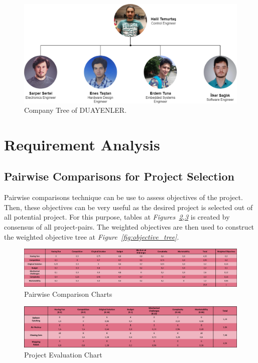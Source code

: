 \documentclass[a4paper,12pt]{article}
\begin{document}
\begin{figure}[t!]
	\centering
	\includegraphics[width=\textwidth,height=\textheight,keepaspectratio]{../../Documents/company/company-tree} 
	\caption{\label{fig:company_tree}Company Tree of DUAYENLER.}
\end{figure}


\section{Requirement Analysis}
	
	\subsection{Pairwise Comparisons for Project Selection}
		Pairwise comparisons technique can be use to assess objectives of the project. Then, these objectives can be very useful as the desired project is selected out of all potential project. For this purpose, tables at \textit{Figures~\ref{fig:pairwise_comp},\ref{fig:project_eval}} is created by consensus of all project-pairs. The weighted objectives are then used to construct the weighted objective tree at \textit{Figure~\ref{fig:objective_tree}}. 

	\begin{figure}[H]
		\centering
		\includegraphics[width=\textwidth,height=\textheight,keepaspectratio]{images/objective_tree} 
		\caption{\label{fig:pairwise_comp}Pairwise Comparison Charts}
	\end{figure}
	
	\begin{figure}[H]
		\centering
		\includegraphics[width=\textwidth,height=\textheight,keepaspectratio]{images/project_evaluation2} 
		\caption{\label{fig:project_eval}Project Evaluation Chart}
	\end{figure}
	
\end{document}
